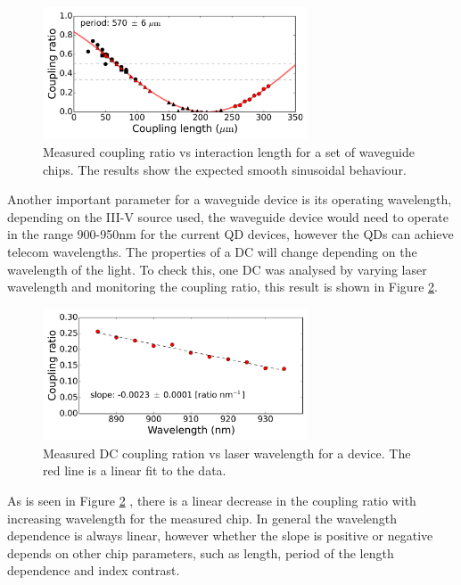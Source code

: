 \begin{figure}[h!] \begin{center}
\includegraphics[width=0.7\textwidth]{images/W008_DC_processing.png}
\caption{Measured coupling ratio vs interaction length for a set of waveguide
chips. The results show the expected smooth sinusoidal behaviour.}
\label{fig:dc_length} \end{center} \end{figure}

Another important parameter for a waveguide device is its operating wavelength,
depending on the III-V source used, the waveguide device would need to operate
in the range 900-950nm for the current QD devices, however the QDs can achieve
telecom wavelengths. The properties of a DC will change depending on the
wavelength of the light. To check this, one DC was analysed by varying laser
wavelength and monitoring the coupling ratio, this result is shown in Figure
\ref{fig:dc_wv}.

\begin{figure}[h!] \begin{center}
\includegraphics[width=0.7\textwidth]{images/W009C01_DV_WV_processing.png}
\caption{Measured DC coupling ration vs laser wavelength for a device. The red
line is a linear fit to the data.} \label{fig:dc_wv} \end{center} \end{figure}

As is seen in Figure \ref{fig:dc_wv} , there is a linear decrease in the
coupling ratio with increasing wavelength for the measured chip. In general the
wavelength dependence is always linear, however whether the slope is positive or
negative depends on other chip parameters, such as length, period of the length
dependence and index contrast.

